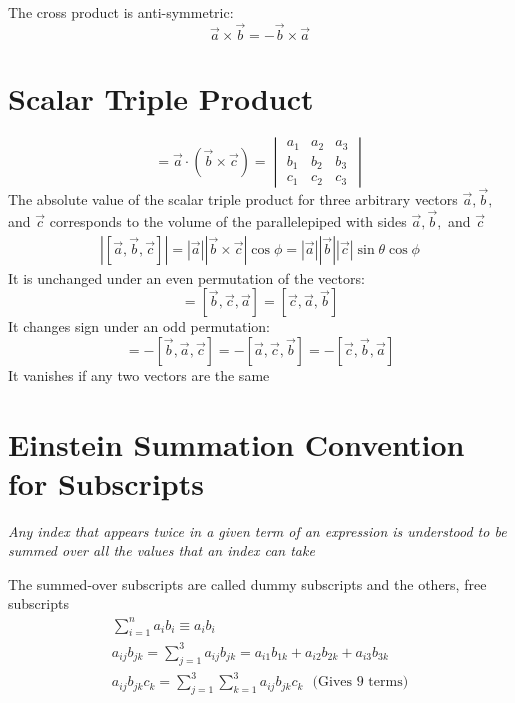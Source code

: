 \documentclass[a4paper, 11pt, normalem]{report}
\begin{document}
The cross product is anti-symmetric:
\begin{equation*}
    \vec{a} \times \vec{b} = -\vec{b} \times \vec{a}
\end{equation*}

\section{Scalar Triple Product}
\begin{equation*}
    [\vec{a}, \vec{b}, \vec{c}] = \vec{a} \cdot (\vec{b} \times \vec{c}) =
    \begin{vmatrix}
        a_1 & a_2 & a_3 \\
        b_1 & b_2 & b_3 \\
        c_1 & c_2 & c_3
    \end{vmatrix}
\end{equation*}
The absolute value of the scalar triple product for three arbitrary vectors $\vec{a}, \vec{b},$ and $\vec{c}$ corresponds to the volume of the parallelepiped with sides $\vec{a}, \vec{b},$ and $\vec{c}$
\begin{gather*}
    |[\vec{a}, \vec{b}, \vec{c}]| = |\vec{a}||\vec{b} \times \vec{c}|\cos\phi = |\vec{a}||\vec{b}||\vec{c}|\sin\theta\cos\phi
\end{gather*}
It is unchanged under an even permutation of the vectors:
\begin{equation*}
    [\vec{a}, \vec{b}, \vec{c}] = [\vec{b}, \vec{c}, \vec{a}] = [\vec{c}, \vec{a}, \vec{b}]
\end{equation*}
It changes sign under an odd permutation:
\begin{equation*}
    [\vec{a}, \vec{b}, \vec{c}] = -[\vec{b}, \vec{a}, \vec{c}] = -[\vec{a}, \vec{c}, \vec{b}] = -[\vec{c}, \vec{b}, \vec{a}]
\end{equation*}
It vanishes if any two vectors are the same

\section{Einstein Summation Convention for Subscripts}
\emph{Any index that appears twice in a given term of an expression is understood to be summed over all the values that an index can take}

The summed-over subscripts are called dummy subscripts and the others, free subscripts
\begin{gather*}
    \sum_{i = 1}^{n} a_{i}b_{i} \equiv a_{i}b_{i} \\
    a_{ij}b_{jk} = \sum_{j = 1}^{3} a_{ij}b_{jk} = a_{i1}b_{1k} + a_{i2}b_{2k} + a_{i3}b_{3k} \\
    a_{ij}b_{jk}c_{k} = \sum_{j = 1}^{3} \sum_{k = 1}^{3} a_{ij}b_{jk}c_{k} ~~~ \text{(Gives 9 terms)}
\end{gather*}
\end{document}
